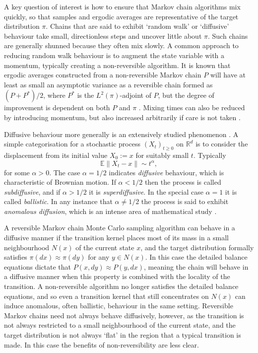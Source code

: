 \documentclass{article}
\theoremstyle{definition}
\theoremstyle{plain}
\begin{document}
A key question of interest is how to ensure that Markov chain algorithms mix quickly, so that samples and ergodic averages are representative of the target distribution $\pi$.  
Chains that are said to exhibit `random walk' or `diffusive' behaviour take small, directionless steps and uncover little about $\pi$. Such chains are generally shunned because they often mix slowly.  A common approach to reducing random walk behaviour is to augment the state variable with a momentum, typically creating a non-reversible algorithm.  It is known that ergodic averages constructed from a non-reversible Markov chain $P$ will have at least as small an asymptotic variance as a reversible chain formed as $(P + P^*)/2$, where $P^*$ is the $L^2(\pi)$-adjoint of $P$, but the degree of improvement is dependent on both $P$ and $\pi$ \cite{andrieu2016random}.  Mixing times can also be reduced by introducing momentum, but also increased arbitrarily if care is not taken \cite{diaconis2000analysis}.

Diffusive behaviour more generally is an extensively studied phenomenon \citep{metzler2000random}.  A simple categorisation for a stochastic process $(X_t)_{t \geq 0}$ on $\mathbb{R}^d$ is to consider the displacement from its initial value $X_0 := x$ for suitably small $t$.  Typically 
\[
\mathbb{E}\|X_t - x\| \sim t^\alpha,
\]
for some $\alpha > 0$.  The case $\alpha = 1/2$ indicates \textit{diffusive} behaviour, which is characteristic of Brownian motion. If $\alpha < 1/2$ then the process is called \textit{subdiffusive}, and if $\alpha > 1/2$ it is \textit{superdiffusive}.  In the special case $\alpha = 1$ it is called \textit{ballistic}. In any instance that $\alpha \neq 1/2$ the process is said to exhibit \textit{anomalous diffusion}, which is an intense area of mathematical study \citep{metzler2000random, bouchaud1990anomalous}.

A reversible Markov chain Monte Carlo sampling algorithm can behave in a diffusive manner if the transition kernel places most of its mass in a small neighbourhood $N(x)$ of the current state $x$, and the target distribution formally satisfies $\pi(dx) \approx \pi(dy)$ for any $y \in N(x)$. In this case the detailed balance equations dictate that $P(x,dy) \approx P(y,dx)$, meaning the chain will behave in a diffusive manner when this property is combined with the locality of the transition.  A non-reversible algorithm no longer satisfies the detailed balance equations, and so even a transition kernel that still concentrates on $N(x)$ can induce anomalous, often ballistic, behaviour in the same setting.  Reversible Markov chains need not always behave diffusively, however, as the transition is not always restricted to a small neighbourhood of the current state, and the target distribution is not always `flat' in the region that a typical transition is made.  In this case the benefits of non-reversibility are less clear.
\end{document}
